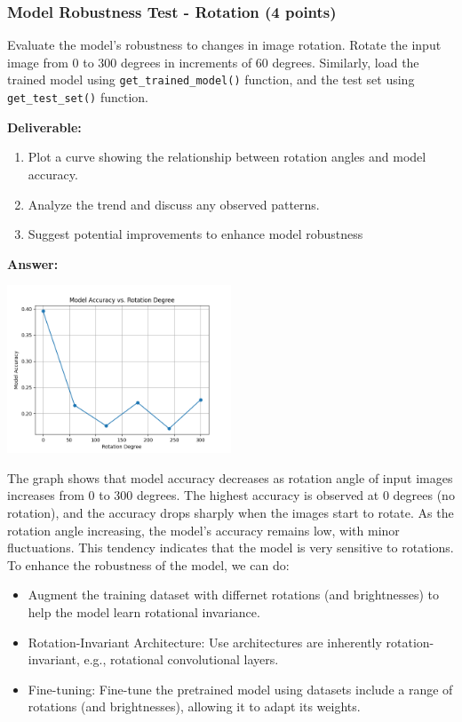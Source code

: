 \documentclass[11pt, oneside]{article}   	%
\begin{document}
\subsubsection*{Model Robustness Test - Rotation (4 points)}

Evaluate the model's robustness to changes in image rotation. Rotate the input image from $0$ to $300$ degrees in increments of $60$ degrees. 
Similarly, load the trained model using \texttt{get\_trained\_model()} function, and the test set using \texttt{get\_test\_set()} function. 

\noindent\textbf{Deliverable:}

\begin{enumerate}
    \item Plot a curve showing the relationship between rotation angles and model accuracy.
    \item Analyze the trend and discuss any observed patterns.
    \item Suggest potential improvements to enhance model robustness
\end{enumerate}

\textbf{Answer:} \\
\begin{center}
    \includegraphics[width=0.5\textwidth]{p2ro_pic/Rotation_accuracy.png}
\end{center}
The graph shows that model accuracy decreases as rotation angle of input images increases from 0 to 300 degrees.
The highest accuracy is observed at 0 degrees (no rotation), and the accuracy drops sharply when the images start to rotate.
As the rotation angle increasing, the model's accuracy remains low, with  minor fluctuations. 
This tendency indicates that the model is very sensitive to rotations. 
\\
To enhance the robustness of the model, we can do:
\begin{itemize}
    \item Augment the training dataset with differnet rotations (and brightnesses) to help the model learn rotational invariance.
    \item Rotation-Invariant Architecture: Use architectures are inherently rotation-invariant, e.g., rotational convolutional layers.
    \item Fine-tuning: Fine-tune the pretrained model using datasets include a range of rotations (and brightnesses), allowing it to adapt its weights.
\end{itemize}
\end{document}
